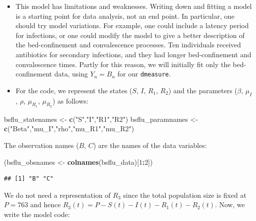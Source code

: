\documentclass[]{article}
\newenvironment{Shaded}{\begin{snugshade}}{\end{snugshade}}
\newcommand{\KeywordTok}[1]{\textcolor[rgb]{0.13,0.29,0.53}{\textbf{#1}}}
\newcommand{\DecValTok}[1]{\textcolor[rgb]{0.00,0.00,0.81}{#1}}
\newcommand{\StringTok}[1]{\textcolor[rgb]{0.31,0.60,0.02}{#1}}
\newcommand{\OperatorTok}[1]{\textcolor[rgb]{0.81,0.36,0.00}{\textbf{#1}}}
\newcommand{\NormalTok}[1]{#1}
\begin{document}
\begin{itemize}
\item
  This model has limitations and weaknesses. Writing down and fitting a
  model is a starting point for data analysis, not an end point. In
  particular, one should try model variations. For example, one could
  include a latency period for infections, or one could modify the model
  to give a better description of the bed-confinement and convalescence
  processes. Ten individuals received antibiotics for secondary
  infections, and they had longer bed-confinement and convalescence
  times. Partly for this reason, we will initially fit only the
  bed-confinement data, using \(Y_n=B_n\) for our \texttt{dmeasure}.
\item
  For the code, we represent the states (\(S\), \(I\), \(R_1\), \(R_2\))
  and the parameters (\(\beta\), \(\mu_I\), \(\rho\), \(\mu_{R_1}\),
  \(\mu_{R_2}\)) as follows:
\end{itemize}

\begin{Shaded}
\begin{Highlighting}[]
\NormalTok{bsflu_statenames <-}\StringTok{ }\KeywordTok{c}\NormalTok{(}\StringTok{"S"}\NormalTok{,}\StringTok{"I"}\NormalTok{,}\StringTok{"R1"}\NormalTok{,}\StringTok{"R2"}\NormalTok{)}
\NormalTok{bsflu_paramnames <-}\StringTok{ }\KeywordTok{c}\NormalTok{(}\StringTok{"Beta"}\NormalTok{,}\StringTok{"mu_I"}\NormalTok{,}\StringTok{"rho"}\NormalTok{,}\StringTok{"mu_R1"}\NormalTok{,}\StringTok{"mu_R2"}\NormalTok{)}
\end{Highlighting}
\end{Shaded}

The observation names (\(B\), \(C\)) are the names of the data
variables:

\begin{Shaded}
\begin{Highlighting}[]
\NormalTok{(bsflu_obsnames <-}\StringTok{ }\KeywordTok{colnames}\NormalTok{(bsflu_data)[}\DecValTok{1}\OperatorTok{:}\DecValTok{2}\NormalTok{])}
\end{Highlighting}
\end{Shaded}

\begin{verbatim}
## [1] "B" "C"
\end{verbatim}

We do not need a representation of \(R_3\) since the total population
size is fixed at \(P=763\) and hence
\(R_3(t)=P-S(t)-I(t)-R_1(t)-R_2(t)\). Now, we write the model code:
\end{document}
